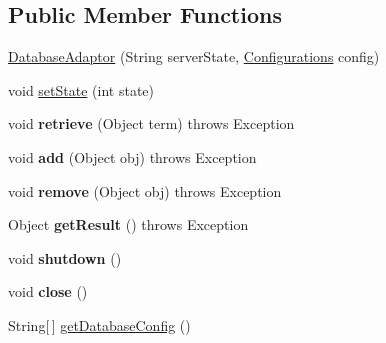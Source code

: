 \subsection*{Public Member Functions}
\begin{DoxyCompactItemize}
\item 
\hyperlink{classw3se_1_1_model_1_1_database_1_1_database_adaptor_abef4d6f0b9b243e18f97a5c5b7d7c1d3}{Database\-Adaptor} (String server\-State, \hyperlink{classw3se_1_1_model_1_1_configurations}{Configurations} config)
\item 
void \hyperlink{classw3se_1_1_model_1_1_database_1_1_database_adaptor_a7a4b6a2db64ac5a797c42bd9046c0fc1}{set\-State} (int state)
\item 
\hypertarget{classw3se_1_1_model_1_1_database_1_1_database_adaptor_adb56bce1b2305c23365ad540b836de0d}{void {\bfseries retrieve} (Object term)  throws Exception 	}\label{classw3se_1_1_model_1_1_database_1_1_database_adaptor_adb56bce1b2305c23365ad540b836de0d}

\item 
\hypertarget{classw3se_1_1_model_1_1_database_1_1_database_adaptor_abb6e60b6d3df1374a6a4027913aa9a2c}{void {\bfseries add} (Object obj)  throws Exception 	}\label{classw3se_1_1_model_1_1_database_1_1_database_adaptor_abb6e60b6d3df1374a6a4027913aa9a2c}

\item 
\hypertarget{classw3se_1_1_model_1_1_database_1_1_database_adaptor_a9bd632405311caf3d7b3c59f8656c6b5}{void {\bfseries remove} (Object obj)  throws Exception 	}\label{classw3se_1_1_model_1_1_database_1_1_database_adaptor_a9bd632405311caf3d7b3c59f8656c6b5}

\item 
\hypertarget{classw3se_1_1_model_1_1_database_1_1_database_adaptor_a6ca577d920ed40151c019793214d417d}{Object {\bfseries get\-Result} ()  throws Exception 	}\label{classw3se_1_1_model_1_1_database_1_1_database_adaptor_a6ca577d920ed40151c019793214d417d}

\item 
\hypertarget{classw3se_1_1_model_1_1_database_1_1_database_adaptor_afac977bdd8618c595cef7260da8f9a14}{void {\bfseries shutdown} ()}\label{classw3se_1_1_model_1_1_database_1_1_database_adaptor_afac977bdd8618c595cef7260da8f9a14}

\item 
\hypertarget{classw3se_1_1_model_1_1_database_1_1_database_adaptor_a8150fc39afa038ede129bdd5b50f56df}{void {\bfseries close} ()}\label{classw3se_1_1_model_1_1_database_1_1_database_adaptor_a8150fc39afa038ede129bdd5b50f56df}

\item 
String\mbox{[}$\,$\mbox{]} \hyperlink{classw3se_1_1_model_1_1_database_1_1_database_adaptor_ad44315787a6058c11c56d0b92e7fc733}{get\-Database\-Config} ()
\end{DoxyCompactItemize}
